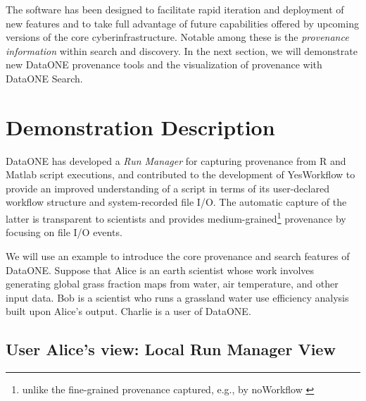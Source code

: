 \documentclass[a4paper]{llncs}
\begin{document}
The software has been designed to facilitate rapid iteration and deployment of new features and to take full advantage of future capabilities offered by upcoming versions of the core cyberinfrastructure. Notable among these is the \emph{provenance information} within search and discovery. In the next section, we will demonstrate new DataONE provenance tools and the visualization of provenance with DataONE Search.


\section{Demonstration Description}  \label{demo}

DataONE has developed a \emph{Run Manager} for capturing provenance from R \cite{recordr} and Matlab \cite{matlabdataone} script executions, and contributed to the development of YesWorkflow \cite{yesworkflow} to provide an improved understanding of a script in terms of its user-declared workflow structure and system-recorded file I/O. The automatic capture of the latter is transparent to scientists and provides medium-grained\footnote{unlike the fine-grained provenance captured, e.g., by noWorkflow \cite{nw14}} provenance by focusing on file I/O events.

We will use an example to introduce the core provenance and search features of DataONE. Suppose that Alice is an earth scientist whose work involves generating global grass fraction maps from water, air temperature, and other input data. Bob is a scientist who runs a grassland water use efficiency analysis built upon Alice's output. Charlie is a user of DataONE.

\subsection{User Alice's view: Local Run Manager View}

\end{document}
